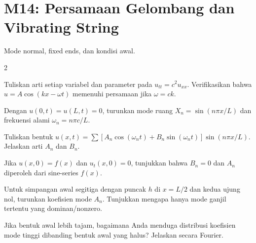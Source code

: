\documentclass[10pt,a4paper]{article}
\newcommand{\level}[1]{\colorbox{levelbg}{\scriptsize\strut #1}}
\newcommand{\src}[1]{\colorbox{sourcebg}{\scriptsize\strut #1}}
\begin{document}
\section*{M14: Persamaan Gelombang dan Vibrating String}
{\color{iteraGray}\small Mode normal, fixed ends, dan kondisi awal.}\par\vspace{1mm}
\begin{multicols}{2}
\begin{qbox}[title={M14.1: Wave equation 1D\hfill \level{L2}\;\src{Var}}]
\small Tuliskan arti setiap variabel dan parameter pada $u_{tt}=c^2u_{xx}$. Verifikasikan bahwa $u=A\cos(kx-\omega t)$ memenuhi persamaan jika $\omega=ck$.
\end{qbox}
\begin{qbox}[title={M14.2: Mode fixed-end\hfill \level{L3}\;\src{Var}}]
\small Dengan $u(0,t)=u(L,t)=0$, turunkan mode ruang $X_n=\sin(n\pi x/L)$ dan frekuensi alami $\omega_n=n\pi c/L$.
\end{qbox}
\begin{qbox}[title={M14.3: Solusi umum modal\hfill \level{L3}\;\src{Var}}]
\small Tuliskan bentuk $u(x,t)=\sum [A_n\cos(\omega_nt)+B_n\sin(\omega_nt)]\sin(n\pi x/L)$. Jelaskan arti $A_n$ dan $B_n$.
\end{qbox}
\begin{qbox}[title={M14.4: Kondisi awal ke koefisien\hfill \level{L3}\;\src{Var}}]
\small Jika $u(x,0)=f(x)$ dan $u_t(x,0)=0$, tunjukkan bahwa $B_n=0$ dan $A_n$ diperoleh dari sine-series $f(x)$.
\end{qbox}
\begin{qbox}[title={M14.5: Tali segitiga\hfill \level{L4}\;\src{PR}}]
\small Untuk simpangan awal segitiga dengan puncak $h$ di $x=L/2$ dan kedua ujung nol, turunkan koefisien mode $A_n$. Tunjukkan mengapa hanya mode ganjil tertentu yang dominan/nonzero.
\end{qbox}
\begin{qbox}[title={M14.6: Energi modal secara kualitatif\hfill \level{L3}\;\src{Var}}]
\small Jika bentuk awal lebih tajam, bagaimana Anda menduga distribusi koefisien mode tinggi dibanding bentuk awal yang halus? Jelaskan secara Fourier.
\end{qbox}
\end{multicols}
\newpage
\end{document}
